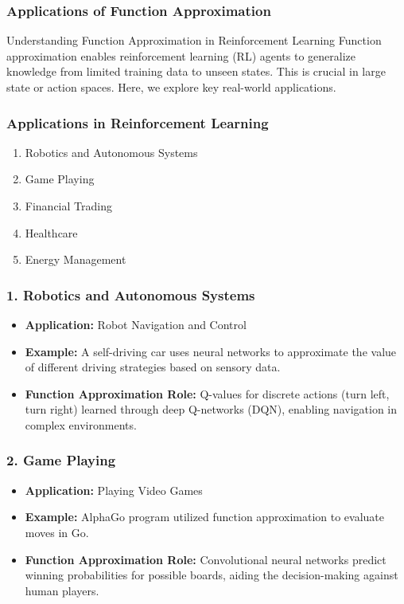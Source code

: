 \documentclass[aspectratio=169]{beamer}
\begin{document}
\begin{frame}[fragile]
    \frametitle{Applications of Function Approximation}
    \begin{block}{Understanding Function Approximation in Reinforcement Learning}
        Function approximation enables reinforcement learning (RL) agents to generalize knowledge from limited training data to unseen states. This is crucial in large state or action spaces. Here, we explore key real-world applications.
    \end{block}
\end{frame}

\begin{frame}[fragile]
    \frametitle{Applications in Reinforcement Learning}
    \begin{enumerate}
        \item Robotics and Autonomous Systems
        \item Game Playing
        \item Financial Trading
        \item Healthcare
        \item Energy Management
    \end{enumerate}
\end{frame}

\begin{frame}[fragile]
    \frametitle{1. Robotics and Autonomous Systems}
    \begin{itemize}
        \item \textbf{Application:} Robot Navigation and Control
        \item \textbf{Example:} A self-driving car uses neural networks to approximate the value of different driving strategies based on sensory data.
        \item \textbf{Function Approximation Role:} Q-values for discrete actions (turn left, turn right) learned through deep Q-networks (DQN), enabling navigation in complex environments.
    \end{itemize}
\end{frame}

\begin{frame}[fragile]
    \frametitle{2. Game Playing}
    \begin{itemize}
        \item \textbf{Application:} Playing Video Games
        \item \textbf{Example:} AlphaGo program utilized function approximation to evaluate moves in Go.
        \item \textbf{Function Approximation Role:} Convolutional neural networks predict winning probabilities for possible boards, aiding the decision-making against human players.
    \end{itemize}
\end{frame}
\end{document}
